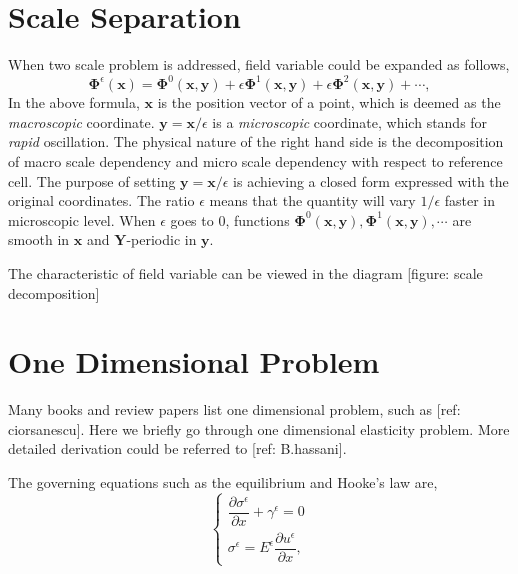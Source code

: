 \documentclass[10pt,a4paper]{scrreprt}
\begin{document}
\section{Scale Separation}
When two scale problem is addressed, field variable could be expanded as follows, 
%
\begin{equation}
\label{eq:field epsi}
\mathbf{\Phi}^{\epsilon}(\mathbf{x}) = \mathbf{\Phi}^{0}(\mathbf{x},\mathbf{y}) + \epsilon\mathbf{\Phi}^{1}(\mathbf{x},\mathbf{y}) + \epsilon\mathbf{\Phi}^{2}(\mathbf{x},\mathbf{y}) + \cdots,
\end{equation}
%
In the above formula, $\mathbf{x}$ is the position vector of a point, which is deemed as the \textit{macroscopic} coordinate. $\mathbf{y}=\mathbf{x}/\epsilon$ is a \textit{microscopic} coordinate, which stands for \textit{rapid} oscillation. The physical nature of the right hand side is the decomposition of macro scale dependency and micro scale dependency with respect to reference cell. The purpose of setting $\mathbf{y}=\mathbf{x}/\epsilon$ is achieving a closed form expressed with the original coordinates. The ratio $\epsilon$ means that the quantity will vary $1/\epsilon$ faster in microscopic level. When $\epsilon$ goes to $0$, functions $\mathbf{\Phi}^{0}(\mathbf{x}, \mathbf{y}), \mathbf{\Phi}^{1}(\mathbf{x}, \mathbf{y}), \cdots$ are smooth in $\mathbf{x}$ and $\mathbf{Y}$-periodic in $\mathbf{y}$.

The characteristic of field variable can be viewed in the diagram [figure: scale decomposition]

\section{One Dimensional Problem}
Many books and review papers list one dimensional problem, such as [ref: ciorsanescu]. Here we briefly go through one dimensional elasticity problem. More detailed derivation could be referred to [ref: B.hassani].

The governing equations such as the equilibrium and Hooke's law are,
\begin{equation}
\left\{
\begin{array}{l}
\dfrac{\partial \sigma^{\epsilon}}{\partial x} + \gamma^{\epsilon} = 0 \\
\sigma^{\epsilon} = E^{\epsilon} \dfrac{\partial u^{\epsilon}}{\partial x},
\end{array}
\right.
\end{equation}
\end{document}
